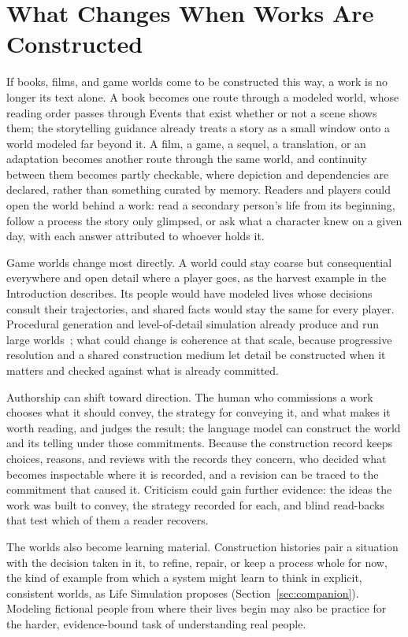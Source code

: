 \documentclass[11pt,a4paper]{article}
\begin{document}
\section{What Changes When Works Are Constructed}
\label{sec:implications}

If books, films, and game worlds come to be constructed this way, a work is no
longer its text alone. A book becomes one route through a modeled world, whose
reading order passes through Events that exist whether or not a scene shows
them; the storytelling guidance already treats a story as a small window onto a
world modeled far beyond it. A film, a game, a sequel, a translation, or an
adaptation becomes another route through the same world, and continuity between
them becomes partly checkable, where depiction and dependencies are declared,
rather than something curated by memory. Readers and players could open the world behind a work: read a
secondary person's life from its beginning, follow a process the story only
glimpsed, or ask what a character knew on a given day, with each answer
attributed to whoever holds it.

Game worlds change most directly. A world could stay coarse but consequential
everywhere and open detail where a player goes, as the harvest example in the
Introduction describes. Its people would have modeled lives whose decisions
consult their trajectories, and shared facts would stay the same for every
player. Procedural generation and level-of-detail simulation already produce and run
large worlds~\cite{brom2007,sunshine2010}; what could change is coherence at that
scale, because progressive resolution and a shared construction medium let detail
be constructed when it matters and checked against what is already committed.

Authorship can shift toward direction. The human who commissions a work chooses
what it should convey, the strategy for conveying it, and what makes it worth
reading, and judges the result; the language model can construct the world and its
telling under those commitments. Because the construction record keeps choices,
reasons, and reviews with the records they concern, who decided what becomes
inspectable where it is recorded, and a revision can be traced to the commitment that caused it.
Criticism could gain further evidence: the ideas the work was built to convey,
the strategy recorded for each, and blind read-backs that test which of them a
reader recovers.

The worlds also become learning material. Construction histories pair a
situation with the decision taken in it, to refine, repair, or keep a process
whole for now, the kind of example from which a system might learn to think in explicit, consistent worlds,
as Life Simulation proposes (Section~\ref{sec:companion}). Modeling fictional people from where their lives
begin may also be practice for the harder, evidence-bound task of understanding real
people.
\end{document}
